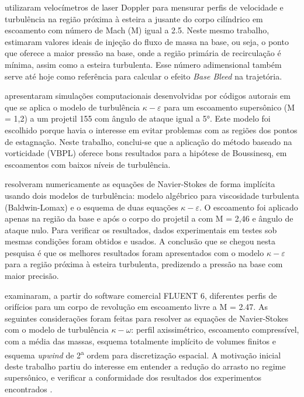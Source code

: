 \cite{Mathur&Dutton1996} utilizaram velocímetros de laser Doppler para mensurar perfis de velocidade e turbulência na região próxima à esteira a jusante do corpo cilíndrico em escoamento com número de Mach (M) igual a \num{2,5}. Neste mesmo trabalho, estimaram valores ideais de injeção do fluxo de massa na base, ou seja, o ponto que oferece a maior pressão na base, onde a região primária de recirculação é mínima, assim como a esteira turbulenta. Esse número adimensional também serve até hoje como referência para calcular o efeito \textit{Base Bleed} na trajetória. 

\cite{Kauri1997} apresentaram simulações computacionais desenvolvidas por códigos autorais em que se aplica o modelo de turbulência \(\kappa-\varepsilon\) para um escoamento supersônico (M = 1,2) a um projetil \qty{155}{\millimetre} com ângulo de ataque igual a \ang{5}. Este modelo foi escolhido porque havia o interesse em evitar problemas com as regiões dos pontos de estagnação. Neste trabalho, conclui-se que a aplicação do método baseado na vorticidade (VBPL) oferece bons resultados para a hipótese de Boussinesq, em escoamentos com baixos níveis de turbulência.

\cite{Sahu1997} resolveram numericamente as equações de Navier-Stokes de forma implícita usando dois modelos de turbulência: modelo algébrico para viscosidade turbulenta (Baldwin-Lomax) e o esquema de duas equações \(\kappa-\varepsilon\). O escoamento foi aplicado apenas na região da base e após o corpo do projetil a com M = 2,46 e ângulo de ataque nulo. Para verificar os resultados, dados experimentais em testes sob mesmas condições foram obtidos e usados. A conclusão que se chegou nesta pesquisa é que os melhores resultados foram apresentados com o modelo \(\kappa-\varepsilon\) para a região próxima à esteira turbulenta, predizendo a pressão na base com maior precisão.

\cite{Lee2006Sep} examinaram, a partir do software comercial FLUENT 6, diferentes perfis de orifícios para um corpo de revolução em escoamento livre a M = \num{2,47}. As seguintes considerações foram feitas para resolver as equações de Navier-Stokes com o modelo de turbulência \(\kappa-\omega\): perfil axissimétrico, escoamento compressível, com a média das massas, esquema totalmente implícito de volumes finitos e esquema \textit{upwind} de 2\textsuperscript{a} ordem para discretização espacial. A motivação inicial deste trabalho partiu do interesse em entender a redução do arrasto no regime supersônico, e verificar a conformidade dos resultados dos experimentos encontrados \cite{Bourdon2003Feb}.

